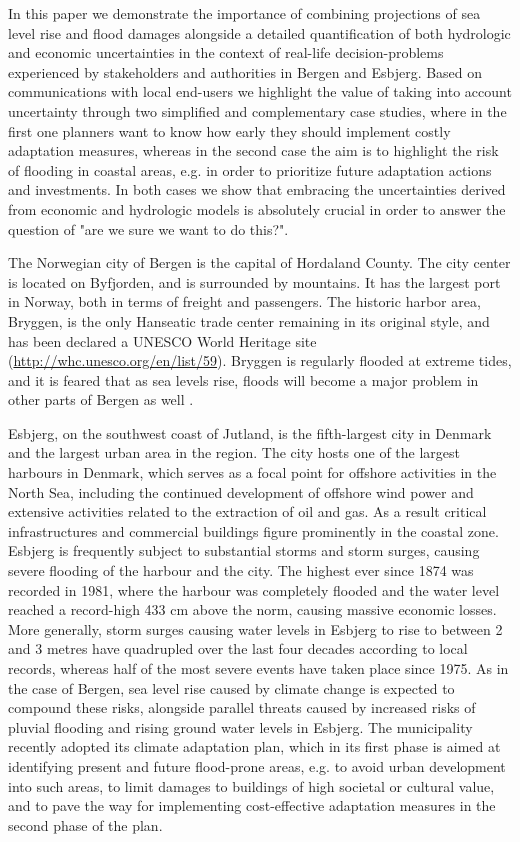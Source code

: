 \documentclass[draft,linenumbers]{agujournal}
\begin{document}
In this paper we demonstrate the importance of combining projections of sea level rise and flood damages alongside a detailed quantification of both hydrologic and economic uncertainties in the context of real-life decision-problems experienced by stakeholders and authorities in Bergen and Esbjerg. Based on communications with local end-users we highlight the value of taking into account uncertainty through two simplified and complementary case studies, where in the first one  planners want to know how early they should implement costly adaptation measures, whereas in the second case the aim is to highlight the risk of flooding in coastal areas, e.g. in order to prioritize future adaptation actions and investments. In both cases we show that embracing the uncertainties derived from economic and hydrologic models is absolutely crucial in order to answer the question of "are we sure we want to do this?". 

The Norwegian city of Bergen is the capital of Hordaland County. The city center is located on Byfjorden, and is surrounded by mountains. It has the largest port in Norway, both in terms of freight and passengers. The historic harbor area, Bryggen, is the only Hanseatic trade center remaining in its original style, and has been declared a UNESCO World Heritage site (\url{http://whc.unesco.org/en/list/59}). Bryggen is regularly flooded at extreme tides, and it is feared that as sea levels rise, floods will become a major problem in other parts of Bergen as well \citep{bergenreport}.

Esbjerg, on the southwest coast of Jutland, is the fifth-largest city in Denmark and the largest urban area in the region. The city hosts one of the largest harbours  in Denmark, which serves as a focal point for offshore activities in the North Sea, including the continued development of offshore wind power and extensive activities related to the extraction of oil and gas. As a result critical infrastructures and commercial buildings figure prominently in the coastal zone. Esbjerg is frequently subject to substantial storms and storm surges, causing severe flooding of the harbour and the city. The highest ever since 1874 was recorded in 1981, where the harbour was completely flooded and the water level reached a record-high 433 cm above the norm, causing massive economic losses.  More generally, storm surges causing water levels in Esbjerg to rise to between 2 and 3 metres have quadrupled over the last four decades according to local records, whereas half of the most severe events have taken place since 1975. As in the case of Bergen, sea level rise caused by climate change is expected to compound these risks, alongside parallel threats caused by increased risks of pluvial flooding and rising ground water levels in Esbjerg. The municipality recently adopted its climate adaptation plan, which in its first phase is aimed at identifying present and future flood-prone areas, e.g. to avoid urban development into such areas, to limit damages to buildings of high societal or cultural value, and to pave the way for implementing cost-effective adaptation measures in the second phase of the plan.   
 
\end{document}
